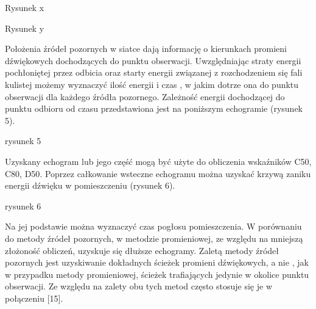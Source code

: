 Rysunek x

Rysunek y

Położenia  źródeł pozornych w siatce dają informację o kierunkach promieni dźwiękowych dochodzących do punktu obserwacji. Uwzględniając straty energii pochłoniętej przez odbicia oraz starty energii związanej z rozchodzeniem się fali kulistej możemy wyznaczyć  ilość energii i czas , w jakim dotrze ona do punktu obserwacji dla każdego źródła pozornego. Zależność energii dochodzącej do punktu odbioru od czasu przedstawiona jest na poniższym echogramie (rysunek 5).

rysunek 5

Uzyskany echogram lub jego część mogą być użyte do obliczenia wskaźników C50, C80, D50. Poprzez całkowanie wsteczne echogramu można uzyskać krzywą zaniku energii dźwięku w pomieszczeniu (rysunek 6).

rysunek 6

Na jej podstawie można wyznaczyć czas pogłosu pomieszczenia. W porównaniu do metody źródeł pozornych, w metodzie promieniowej, ze względu na mniejszą złożoność obliczeń, uzyskuje się dłuższe echogramy. Zaletą metody źródeł pozornych jest uzyskiwanie dokładnych ścieżek promieni dźwiękowych, a nie , jak w przypadku metody promieniowej, ścieżek trafiających jedynie w okolice punktu obserwacji. Ze względu na zalety obu tych metod często stosuje się je w połączeniu [15].















